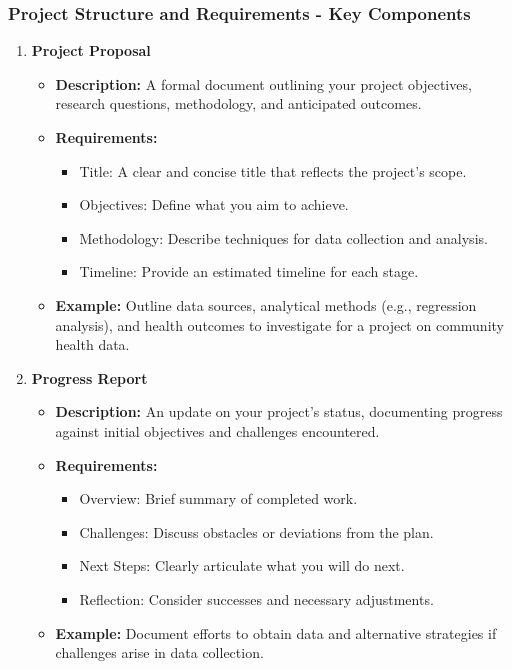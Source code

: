 \documentclass[aspectratio=169]{beamer}
\begin{document}
\begin{frame}[fragile]
    \frametitle{Project Structure and Requirements - Key Components}
    \begin{enumerate}
        \item \textbf{Project Proposal}
        \begin{itemize}
            \item \textbf{Description:} A formal document outlining your project objectives, research questions, methodology, and anticipated outcomes.
            \item \textbf{Requirements:}
            \begin{itemize}
                \item Title: A clear and concise title that reflects the project's scope.
                \item Objectives: Define what you aim to achieve.
                \item Methodology: Describe techniques for data collection and analysis.
                \item Timeline: Provide an estimated timeline for each stage.
            \end{itemize}
            \item \textbf{Example:} Outline data sources, analytical methods (e.g., regression analysis), and health outcomes to investigate for a project on community health data.
        \end{itemize}
        
        \item \textbf{Progress Report}
        \begin{itemize}
            \item \textbf{Description:} An update on your project's status, documenting progress against initial objectives and challenges encountered.
            \item \textbf{Requirements:}
            \begin{itemize}
                \item Overview: Brief summary of completed work.
                \item Challenges: Discuss obstacles or deviations from the plan.
                \item Next Steps: Clearly articulate what you will do next.
                \item Reflection: Consider successes and necessary adjustments.
            \end{itemize}
            \item \textbf{Example:} Document efforts to obtain data and alternative strategies if challenges arise in data collection.
        \end{itemize}
    \end{enumerate}
\end{frame}
\end{document}
